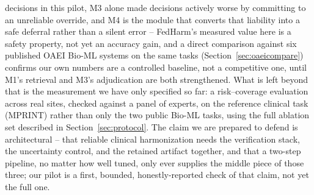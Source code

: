 \documentclass[conference]{IEEEtran}
\begin{document}
decisions in this pilot, M3 alone made decisions actively worse by committing to an unreliable override, and M4 is the module that converts that liability into a safe deferral rather than a silent error -- FedHarm's measured value here is a safety property, not yet an accuracy gain, and a direct comparison against six published OAEI Bio-ML systems on the same tasks (Section~\ref{sec:oaeicompare}) confirms our own numbers are a controlled baseline, not a competitive one, until M1's retrieval and M3's adjudication are both strengthened. What is left beyond that is the measurement we have only specified so far: a risk--coverage evaluation across real sites, checked against a panel of experts, on the reference clinical task (MPRINT) rather than only the two public Bio-ML tasks, using the full ablation set described in Section~\ref{sec:protocol}. The claim we are prepared to defend is architectural -- that reliable clinical harmonization needs the verification stack, the uncertainty control, and the retained artifact together, and that a two-step pipeline, no matter how well tuned, only ever supplies the middle piece of those three; our pilot is a first, bounded, honestly-reported check of that claim, not yet the full one.
\end{document}
